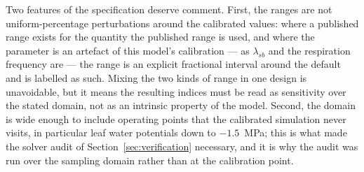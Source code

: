 \documentclass[a4paper,fleqn]{cas-sc}
\begin{document}
Two features of the specification deserve comment. First, the ranges are not
uniform-percentage perturbations around the calibrated values: where a
published range exists for the quantity the published range is used, and
where the parameter is an artefact of this model's calibration --- as
$\lambda_{sb}$ and the respiration frequency are --- the range is an
explicit fractional interval around the default and is labelled as such.
Mixing the two kinds of range in one design is unavoidable, but it means the
resulting indices must be read as sensitivity over the stated domain, not as
an intrinsic property of the model. Second, the domain is wide enough to
include operating points that the calibrated simulation never visits, in
particular leaf water potentials down to $-1.5$~MPa; this is what made the
solver audit of Section~\ref{sec:verification} necessary, and it is why the
audit was run over the sampling domain rather than at the calibration point.

\end{document}
